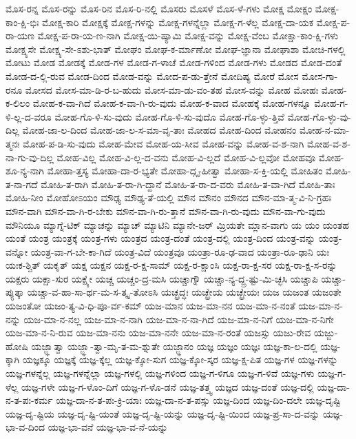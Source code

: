{ಮೊಸ-ರನ್ನ
ಮೊಸ-ರನ್ನು
ಮೊಸ-ರಿನ
ಮೊಸ-ರಿ-ನಲ್ಲಿ
ಮೊಸರು
ಮೊಸಳೆ
ಮೊಸ-ಳೆ-ಗಳು
ಮೋಕ್ಷ
ಮೋಕ್ಷಂ
ಮೋಕ್ಷ-ಕಾಂ-ಕ್ಷಿ-ಭಿಃ
ಮೋಕ್ಷ-ಕಾರಿ
ಮೋಕ್ಷಕ್ಕೆ
ಮೋಕ್ಷ-ಗಳನ್ನು
ಮೋಕ್ಷ-ಗಳನ್ನೆಲ್ಲಾ
ಮೋಕ್ಷ-ಗ-ಳೆಲ್ಲ
ಮೋಕ್ಷ-ದಾ-ಯಕ
ಮೋಕ್ಷ-ಪ-ರಾ-ಯಣ
ಮೋಕ್ಷ-ಪ-ರಾ-ಯ-ಣ-ನಾಗಿ
ಮೋಕ್ಷ-ಯಿ-ಷ್ಯಾಮಿ
ಮೋಕ್ಷ-ವನ್ನು
ಮೋಕ್ಷ-ವೆಂಬ
ಮೋಕ್ಷಾ-ಕಾಂ-ಕ್ಷಿ-ಗಳು
ಮೋಕ್ಷ್ಯಸೇ
ಮೋಕ್ಷ್ಯ-ಸೇ-ಽಶು-ಭಾತ್
ಮೋಘಂ
ಮೋಘ-ಕ-ರ್ಮಾಣೋ
ಮೋಘ-ಜ್ಞಾನಾ
ಮೋಘಾಶಾ
ಮೋಚಿ-ಗಳಲ್ಲಿ
ಮೋಟು
ಮೋಡ
ಮೋಡಕ್ಕೆ
ಮೋಡ-ಗಳ
ಮೋಡ-ಗ-ಳಾಚೆ
ಮೋಡ-ಗಳಿಂದ
ಮೋಡ-ಗಳು
ಮೋಡದ
ಮೋಡ-ದಂತೆ
ಮೋಡ-ದ-ಲ್ಲಿ-ರುವ
ಮೋಡ-ದಿಂದ
ಮೋಡ-ವನ್ನು
ಮೋದ-ಪ-ಡು-ತ್ತೇನೆ
ಮೋದಿಷ್ಯ
ಮೋರೆ
ಮೋಸ
ಮೋಸ-ಗಾ-ರನೂ
ಮೋಸದ
ಮೋಸ-ಮಾ-ಡಿ-ರ-ಬ-ಹುದು
ಮೋಸ-ಮಾ-ಡು-ವಂ-ತಹ
ಮೋಸ-ವನ್ನು
ಮೋಹ
ಮೋಹಃ
ಮೋಹ-ಕ-ಲಿಲಂ
ಮೋಹ-ಕ-ವಾ-ಗಿದೆ
ಮೋಹ-ಕ-ವಾ-ಗಿ-ರು-ವುದು
ಮೋಹ-ಕ-ವಾದ
ಮೋಹಕ್ಕೆ
ಮೋಹ-ಗಳನ್ನೂ
ಮೋಹ-ಗ-ಳಿ-ಲ್ಲ-ದ-ವರೂ
ಮೋಹ-ಗೊ-ಳಿ-ಸು-ವುದು
ಮೋಹ-ಗೊ-ಳಿ-ಸು-ವುದೊ
ಮೋಹ-ಗೊ-ಳ್ಳು-ತ್ತಿವೆ
ಮೋಹ-ಗೊ-ಳ್ಳು-ವು-ದಿಲ್ಲ
ಮೋಹ-ಜಾ-ಲ-ದಿಂದ
ಮೋಹ-ಜಾ-ಲ-ಸ-ಮಾ-ವೃ-ತಾಃ
ಮೋಹದ
ಮೋಹ-ದಿಂದ
ಮೋಹನಂ
ಮೋಹ-ನ-ಮಾ-ತ್ಮನಃ
ಮೋಹ-ಪ-ಡಿ-ಸು-ವುದು
ಮೋಹ-ಮೇವ
ಮೋಹ-ಯ-ಸೀವ
ಮೋಹ-ವನ್ನು
ಮೋಹ-ವ-ಶ-ನಾಗಿ
ಮೋಹ-ವ-ಶ-ನಾ-ಗು-ವು-ದಿಲ್ಲ
ಮೋಹ-ವಿಲ್ಲ
ಮೋಹ-ವಿ-ಲ್ಲ-ದ-ವನು
ಮೋಹ-ವಿ-ಲ್ಲದೆ
ಮೋಹ-ವಿ-ಲ್ಲವೋ
ಮೋಹವೂ
ಮೋಹ-ಶೂ-ನ್ಯ-ನಾಗಿ
ಮೋಹಾ-ತ್ತಸ್ಯ
ಮೋಹಾ-ದಾ-ರ-ಭ್ಯತೇ
ಮೋಹಾ-ದ್ಗೃ-ಹೀತ್ವಾ
ಮೋಹಾ-ಸ-ಕ್ತಿ-ಯಲ್ಲಿ
ಮೋಹಿತಂ
ಮೋಹಿ-ತ-ನಾ-ಗದೆ
ಮೋಹಿ-ತ-ರಾಗಿ
ಮೋಹಿ-ತ-ರಾ-ಗಿ-ದ್ದಾನೆ
ಮೋಹಿ-ತ-ರಾ-ದ-ವರು
ಮೋಹಿ-ತ-ವಾ-ಗಿದೆ
ಮೋಹಿ-ತಾಃ
ಮೋಹಿ-ನೀಂ
ಮೋಹೋಽಯಂ
ಮೌಢ್ಯ
ಮೌಢ್ಯ-ತೆ-ಯಲ್ಲಿ
ಮೌನ
ಮೌನಂ
ಮೌನದ
ಮೌನ-ಮಾ-ತ್ಮ-ವಿ-ನಿ-ಗ್ರಹಃ
ಮೌನ-ವಾಗಿ
ಮೌನ-ವಾ-ಗಿ-ರ-ಬೇಕು
ಮೌನ-ವಾ-ಗಿ-ರು-ತ್ತಾನೆ
ಮೌನ-ವಾ-ಗಿ-ರು-ವುದು
ಮೌನ-ವಾ-ಗು-ವುದು
ಮೌನಿಯೂ
ಮ್ಯಾಗ್ನೆ-ಟಿಕ್
ಮ್ಯಾಚನ್ನು
ಮ್ಯಾಚ್
ಮ್ಯಾಟಿನಿ
ಮ್ಯಾನೇ-ಜರ್
ಮ್ರಿಯತೇ
ಮ್ಲಾನ-ವಾಗು
ಯ
ಯಂ
ಯಂತಹ
ಯಂತೆ
ಯಂತ್ರ
ಯಂತ್ರಕ್ಕೆ
ಯಂತ್ರ-ಗಳು
ಯಂತ್ರದ
ಯಂತ್ರ-ದಂತೆ
ಯಂತ್ರ-ದಲ್ಲಿ
ಯಂತ್ರ-ದಿಂದ
ಯಂತ್ರ-ವನ್ನು
ಯಂತ್ರ-ವನ್ನೋ
ಯಂತ್ರ-ವಾ-ಗ-ಬೇ-ಕಾ-ಗಿದೆ
ಯಂತ್ರ-ವಿದೆ
ಯಂತ್ರವೂ
ಯಂತ್ರಾ-ರೂ-ಢ-ವಾದ
ಯಂತ್ರಾ-ರೂ-ಢಾನಿ
ಯಃ
ಯಃಕ-ಶ್ಚಿತ್
ಯಕೃತ್
ಯಕ್ಷ
ಯಕ್ಷನ
ಯಕ್ಷ-ರ-ಕ್ಷ-ಸಾಮ್
ಯಕ್ಷ-ರ-ಕ್ಷಾಂಸಿ
ಯಕ್ಷ-ರಾ-ಕ್ಷ-ಸರ
ಯಕ್ಷ-ರಾ-ಕ್ಷ-ಸ-ರನ್ನು
ಯಕ್ಷರು
ಯಕ್ಷಾ-ಸುರ
ಯಕ್ಷ್ಯೇ
ಯಚ್ಚ
ಯಚ್ಚಂ-ದ್ರ-ಮಸಿ
ಯಚ್ಚಾಗ್ನೌ
ಯಚ್ಚಾ-ನ್ಯ-ದ್ದ್ರ-ಷ್ಟು-ಮಿ-ಚ್ಛಸಿ
ಯಚ್ಚಾಪಿ
ಯಚ್ಚಾ-ಪ್ಯುತ್ಕಾ
ಯಚ್ಚಾ-ವ-ಹಾ-ಸಾ-ರ್ಥ-ಮ-ಸ-ತ್ಕೃ-ತೋಽಸಿ
ಯಚ್ಛ್ರದ್ಧಃ
ಯಚ್ಛ್ರೇಯ
ಯಚ್ಛ್ರೇಯಃ
ಯಜ
ಯಜಂತ
ಯಜಂತೇ
ಯಜಂತೋ
ಯಜಂ-ತ್ಯ-ವಿ-ಧಿ-ಪೂ-ರ್ವ-ಕಮ್
ಯಜ-ಮಾನ
ಯಜ-ಮಾ-ನನ
ಯಜ-ಮಾ-ನ-ನಂತೆ
ಯಜ-ಮಾ-ನ-ನನ್ನು
ಯಜ-ಮಾ-ನ-ನಲ್ಲ
ಯಜ-ಮಾ-ನ-ನಾಗಿ
ಯಜ-ಮಾ-ನ-ನಾ-ಗಿದೆ
ಯಜ-ಮಾ-ನ-ನಿಗೆ
ಯಜ-ಮಾ-ನ-ನಿಗೇ
ಯಜ-ಮಾ-ನ-ನಿ-ರುವ
ಯಜ-ಮಾ-ನನು
ಯಜ-ಮಾ-ನನೇ
ಯಜ-ಮಾ-ನ-ರಂತೆ
ಯಜಸ್ಸು
ಯಜು-ರೇವ
ಯಜ್ಜು-ಹೋಷಿ
ಯಜ್ಜ್ಞಾತ್ವಾ
ಯಜ್ಜ್ಞಾ-ತ್ವಾ-ಮೃ-ತ-ಮ-ಶ್ನುತೇ
ಯಜ್ಜ್ಞಾನಂ
ಯಜ್ಞ
ಯಜ್ಞಂ
ಯಜ್ಞಃ
ಯಜ್ಞ-ಕಾ-ಲ-ದಲ್ಲಿ
ಯಜ್ಞ-ಕ್ಕಾಗಿ
ಯಜ್ಞಕ್ಕೂ
ಯಜ್ಞಕ್ಕೆ
ಯಜ್ಞ-ಕ್ಕೆಲ್ಲ
ಯಜ್ಞ-ಕ್ಕೋ-ಸುಗ
ಯಜ್ಞ-ಕ್ಕೋ-ಸ್ಕರ
ಯಜ್ಞ-ಕ್ಷ-ಪಿತ
ಯಜ್ಞ-ಗಳ
ಯಜ್ಞ-ಗಳನ್ನು
ಯಜ್ಞ-ಗಳನ್ನೆಲ್ಲ
ಯಜ್ಞ-ಗಳನ್ನೆಲ್ಲಾ
ಯಜ್ಞ-ಗಳಲ್ಲಿ
ಯಜ್ಞ-ಗಳಿಂದ
ಯಜ್ಞ-ಗ-ಳಿಗೂ
ಯಜ್ಞ-ಗ-ಳಿವೆ
ಯಜ್ಞ-ಗಳು
ಯಜ್ಞ-ಗ-ಳೆಲ್ಲ
ಯಜ್ಞ-ಗಳೇ
ಯಜ್ಞ-ಗ-ಳೊಂ-ದಿಗೆ
ಯಜ್ಞ-ಗ-ಳೊ-ಡನೆ
ಯಜ್ಞ-ತತ್ತ್ವ
ಯಜ್ಞದ
ಯಜ್ಞ-ದಂತೆ
ಯಜ್ಞ-ದಲ್ಲಿ
ಯಜ್ಞ-ದಾ-ನ-ತ-ಪಃ-ಕರ್ಮ
ಯಜ್ಞ-ದಾ-ನ-ತ-ಪಃ-ಕ್ರಿ-ಯಾಃ
ಯಜ್ಞ-ದಾ-ನ-ತ-ಪಸ್ಸು
ಯಜ್ಞ-ದಿಂದ
ಯಜ್ಞ-ದಿಂ-ದಲೇ
ಯಜ್ಞ-ದೃಷ್ಟಿ
ಯಜ್ಞ-ದೃ-ಷ್ಟಿಯ
ಯಜ್ಞ-ದೃ-ಷ್ಟಿ-ಯಂತೆ
ಯಜ್ಞ-ದೃ-ಷ್ಟಿ-ಯನ್ನು
ಯಜ್ಞ-ದೃ-ಷ್ಟಿ-ಯಿಂದ
ಯಜ್ಞ-ಪ್ರ-ಸಾ-ದ-ವನ್ನು
ಯಜ್ಞ-ಭಾ-ವ-ದಿಂದ
ಯಜ್ಞ-ಭಾ-ವನೆ
ಯಜ್ಞ-ಭಾ-ವ-ನೆ-ಯನ್ನು
}
